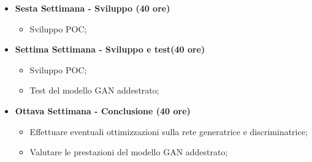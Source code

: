 {\begin{itemize}
\begin{itemize}
                  \item Studio sulle implementazioni della rete discriminatrice (Discriminator) del GAN;
              \end{itemize}
        \item \textbf{Sesta Settimana - Sviluppo (40 ore)}
              \begin{itemize}
                  \item Sviluppo POC;
              \end{itemize}
        \item \textbf{Settima Settimana - Sviluppo e test(40 ore)}
              \begin{itemize}
                  \item Sviluppo POC;
                  \item Test del modello GAN addestrato;
              \end{itemize}
        \item \textbf{Ottava Settimana - Conclusione (40 ore)}
              \begin{itemize}
                  \item Effettuare eventuali ottimizzazioni sulla rete generatrice e discriminatrice;
                  \item Valutare le prestazioni del modello GAN addestrato;
              \end{itemize}
    \end{itemize}
}

\newcommand{\totaleOre}{302}

\newcommand{\obiettiviObbligatori}{
    \item \underline{\textit{O01}}: Comprendere il funzionamento teorico dei GAN e le loro applicazioni per la generazione di immagini.;
    \item \underline{\textit{O02}}: Sviluppare la capacità di autogestirsi e affrontare argomenti sull'argomento GAN attraverso l'autoformazione;
    \item \underline{\textit{O03}}: Sviluppo di un POC dimostrativo;

}

\newcommand{\obiettiviDesiderabili}{
    \item \underline{\textit{D01}}: Implementazione di un modello GAN per la generazione di immagini funzionante;
    \item \underline{\textit{D02}}: Generazione di immagini realistiche e coerenti con il dataset di addestramento
    \item \underline{\textit{D03}}: Personalizzare il modello GAN per l'inserimento del brand "Replay" nelle immagini di output
}

\newcommand{\obiettiviFacoltativi}{
    \item \underline{\textit{F01}}: Ottimizzazione del modello GAN
    \item \underline{\textit{F02}}: Valutare le prestazioni del modello GAN
    \item \item \underline{\textit{F03}}: Test applicazione prodotto finale in ambito aziendale
}
